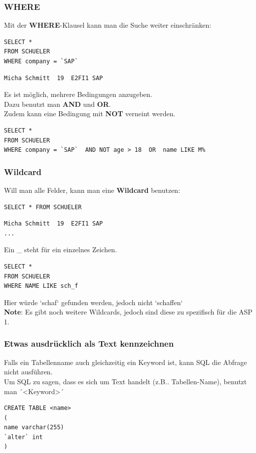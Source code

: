 \documentclass[10pt]{article}
\begin{document}
\subsubsection{WHERE}
Mit der \textbf{WHERE}-Klausel kann man die Suche weiter einschränken:
\begin{lstlisting}
SELECT * 
FROM SCHUELER 
WHERE company = `SAP`
\end{lstlisting}
\begin{verbatim}
Micha Schmitt  19  E2FI1 SAP
\end{verbatim}
Es ist möglich, mehrere Bedingungen anzugeben. \\
Dazu  benutzt man \textbf{AND} und \textbf{OR}.\\
Zudem kann eine Bedingung mit \textbf{NOT} verneint  werden.
\begin{lstlisting}
SELECT * 
FROM SCHUELER 
WHERE company = `SAP`  AND NOT age > 18  OR  name LIKE M%
\end{lstlisting}

\subsubsection{Wildcard}
Will man alle Felder, kann man eine \textbf{Wildcard} benutzen:
\begin{lstlisting}
SELECT * FROM SCHUELER
\end{lstlisting}
\begin{verbatim}
Micha Schmitt  19  E2FI1 SAP
...
\end{verbatim}
Ein \_ steht  für  ein einzelnes Zeichen. 
\begin{lstlisting}
SELECT * 
FROM SCHUELER
WHERE NAME LIKE sch_f
\end{lstlisting}
Hier würde `schaf` gefunden werden,  jedoch nicht `schaffen` \\
\textbf{Note}: Es gibt noch weitere Wildcards, jedoch  sind diese zu spezifisch für die ASP 1.

\subsubsection{Etwas ausdrücklich als Text kennzeichnen}

Falls ein Tabellenname auch gleichzeitig ein Keyword ist, kann SQL die Abfrage nicht ausführen. \\
Um SQL zu sagen, dass es sich um Text handelt (z.B.. Tabellen-Name), benutzt man ´\textless Keyword\textgreater´

\begin{lstlisting}
CREATE TABLE <name>
(
name varchar(255)
`alter` int
)
\end{lstlisting}
\end{document}
